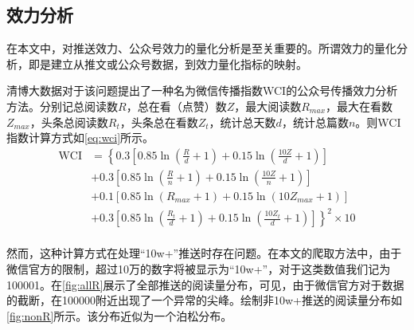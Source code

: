 \documentclass[a4paper,12pt,UTF8]{article}
\begin{document}
    \subsection{效力分析}
    \label{sub:xiaoli}
    在本文中，对推送效力、公众号效力的量化分析是至关重要的。所谓效力的量化分析，即是建立从推文或公众号数据，到效力量化指标的映射。
    
    清博大数据对于该问题提出了一种名为微信传播指数WCI的公众号传播效力分析方法\cite{清博大数据2020}。分别记总阅读数$R$，总在看（点赞）数$Z$，最大阅读数$R_{max}$，最大在看数$Z_{max}$，头条总阅读数$R_t$，头条总在看数$Z_t$，统计总天数$d$，统计总篇数$n$。则WCI指数计算方式如\cref{eq:wci}所示。
    \begin{equation}
      \label{eq:wci}
      \begin{aligned}
        \text{WCI} &= \left\{ 0.3\left[0.85 \ln (\frac{R}{d} + 1)+ 0.15 \ln (\frac{10Z}{d} + 1)\right] \right. \\
                   &+ 0.3\left[0.85 \ln (\frac{R}{n} + 1)+ 0.15 \ln (\frac{10Z}{n} + 1)\right] \\
                   &+ 0.1\left[0.85 \ln (R_{max} + 1)+ 0.15 \ln (10Z_{max} + 1)\right] \\
                   &\left. + 0.3\left[0.85 \ln (\frac{R_t}{d} + 1)+ 0.15 \ln (\frac{10Z_t}{d} + 1)\right]  \right\} ^ 2 \times 10 \\
      \end{aligned}
    \end{equation}

    然而，这种计算方式在处理“10w+”推送时存在问题。在本文的爬取方法中，由于微信官方的限制，超过10万的数字将被显示为“10w+”，对于这类数值我们记为100001。在\cref{fig:allR}展示了全部推送的阅读量分布，可见，由于微信官方对于数据的截断，在100000附近出现了一个异常的尖峰。绘制非10w+推送的阅读量分布如\cref{fig:nonR}所示。该分布近似为一个泊松分布。
    
\end{document}
